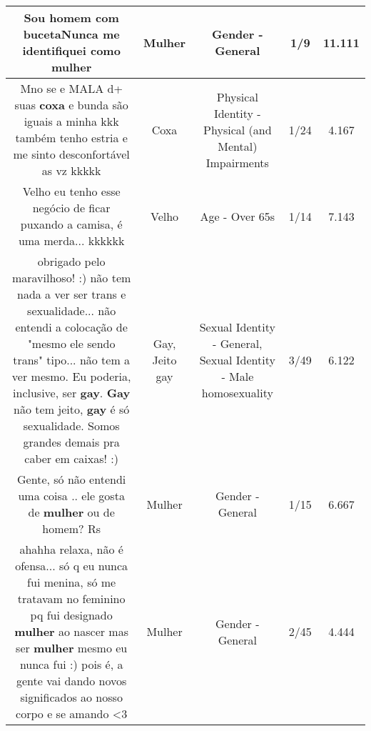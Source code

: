 \documentclass[11pt]{article}
\newlength\mylength
\begin{document}
\begin{center}
\begin{longtable}{|C{.65\mylength}|C{.30\mylength}|C{.12\mylength}|C{.12\mylength}|C{.12\mylength}|}
  \small Sou homem com bucetaNunca me identifiquei como mulher\normalsize   & Mulher & Gender - General & 1/9 & 11.111 \\  \hline
  \small Mno se e MALA d+ suas \textbf{coxa} e bunda são iguais a minha kkk também tenho estria e me sinto desconfortável as vz kkkkk\normalsize   & Coxa & Physical Identity - Physical (and Mental) Impairments & 1/24 & 4.167 \\  \hline
  \small Velho eu tenho esse negócio de ficar puxando a camisa,  é uma merda... kkkkkk\normalsize   & Velho & Age - Over 65s & 1/14 & 7.143 \\  \hline
  \small obrigado pelo maravilhoso! :) não tem nada a ver ser trans e sexualidade... não entendi a colocação de "mesmo ele sendo trans" tipo... não tem a ver mesmo. Eu poderia, inclusive, ser \textbf{gay}. \textbf{Gay} não tem jeito, \textbf{gay} é só sexualidade. Somos grandes demais pra caber em caixas! :)\normalsize   & Gay, Jeito gay & Sexual Identity - General, Sexual Identity - Male homosexuality & 3/49 & 6.122 \\  \hline
  \small Gente, só não entendi uma coisa .. ele gosta de \textbf{mulher} ou de homem? Rs\normalsize   & Mulher & Gender - General & 1/15 & 6.667 \\  \hline
  \small ahahha relaxa, não é ofensa... só q eu nunca fui menina, só me tratavam no feminino pq fui designado \textbf{mulher} ao nascer mas ser \textbf{mulher} mesmo eu nunca fui :) pois é, a gente vai dando novos significados ao nosso corpo e se amando <3\normalsize   & Mulher & Gender - General & 2/45 & 4.444 \\  \hline

\end{longtable}
\end{center}
\end{document}
